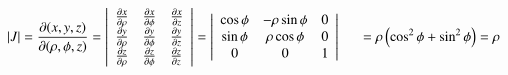 \documentclass[11pt]{extarticle}
\newcommand{\pp}[2][x]{\frac{\partial #2}{\partial #1}}
\begin{document}



\begin{center}
   $\begin{aligned}
      |J| = \pp[(\rho,\phi,z)]{(x,y,z)} =
      \left|\begin{array}{lll}
         \frac{\partial x}{\partial \rho} & \frac{\partial x}{\partial \phi} & \frac{\partial x}{\partial z} \\
         \frac{\partial y}{\partial \rho} & \frac{\partial y}{\partial \phi} & \frac{\partial y}{\partial z} \\
         \frac{\partial z}{\partial \rho} & \frac{\partial z}{\partial \phi} & \frac{\partial z}{\partial z}
      \end{array}\right| &=
      \left|\begin{array}{ccc}
         \cos \phi & -\rho \sin \phi & 0 \\
         \sin \phi & \rho \cos \phi & 0 \\
         0 & 0 & 1
      \end{array}\right| \tab
      & =\rho\left(\cos^2 \phi+\sin^2 \phi\right) =\rho
   \end{aligned}$
\end{center}
\end{document}
